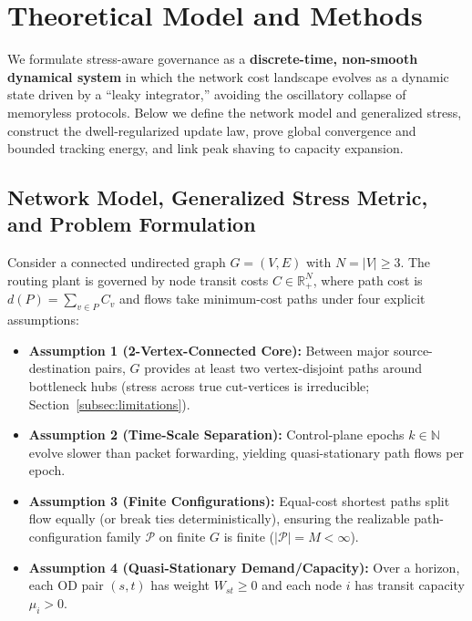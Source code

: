 \documentclass{ccjnl}
\newcommand{\rev}[1]{{\color{blue}#1}}
\def\rev#1{#1}%
\begin{document}
\section{Theoretical Model and Methods}
\label{sec:model}

We formulate stress-aware governance as a \textbf{discrete-time, non-smooth dynamical system} in which the network cost landscape evolves as a dynamic state driven by a ``leaky integrator,'' avoiding the oscillatory collapse of memoryless protocols. Below we define the network model and generalized stress, construct the dwell-regularized update law, prove global convergence and bounded tracking energy, and link peak shaving to capacity expansion.

\subsection{Network Model, \rev{Generalized Stress Metric, and Problem Formulation}}

Consider a connected undirected graph $G=(V,E)$ with $N=|V| \ge 3$. The routing plant is governed by node transit costs $C \in \mathbb{R}^N_+$, where path cost is $d(P) = \sum_{v \in P} C_v$ and flows take minimum-cost paths under four explicit assumptions:
\rev{\begin{itemize}
    \item \textbf{Assumption 1 (2-Vertex-Connected Core):} Between major source-destination pairs, $G$ provides at least two vertex-disjoint paths around bottleneck hubs (stress across true cut-vertices is irreducible; Section~\ref{subsec:limitations}).
    \item \textbf{Assumption 2 (Time-Scale Separation):} Control-plane epochs $k \in \mathbb{N}$ evolve slower than packet forwarding, yielding quasi-stationary path flows per epoch.
    \item \textbf{Assumption 3 (Finite Configurations):} Equal-cost shortest paths split flow equally (or break ties deterministically), ensuring the realizable path-configuration family $\mathcal{P}$ on finite $G$ is finite ($|\mathcal{P}| = M < \infty$).
    \item \textbf{Assumption 4 (Quasi-Stationary Demand/Capacity):} Over a horizon, each OD pair $(s,t)$ has weight $W_{st} \ge 0$ and each node $i$ has transit capacity $\mu_i > 0$.
\end{itemize}}
\end{document}
